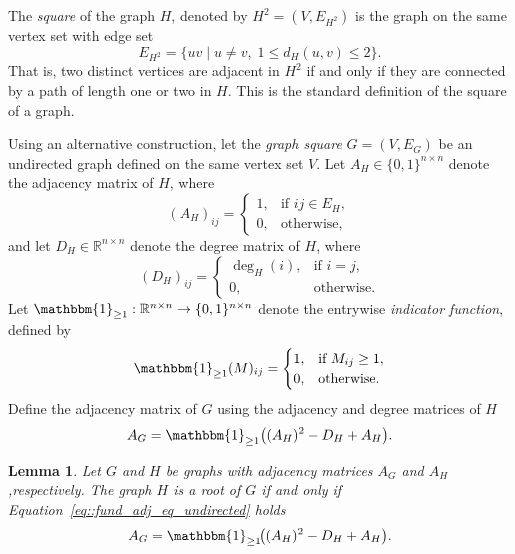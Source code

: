 \documentclass[11pt]{article}
\newtheorem{lemma}{Lemma}
\begin{document}
The \emph{square} of the graph $H$, denoted by $H^2 = (V, E_{H^2})$ is the graph on the same vertex set with edge set
\begin{equation} \label{eq::fund_def_square}
  E_{H^2} = \{ uv \mid u \neq v,\; 1 \leq d_H(u,v) \leq 2 \}.
\end{equation}
That is, two distinct vertices are adjacent in $H^2$ if and only if they are connected by a path of length one or two in $H$. This is the standard definition of the square of a graph.

Using an alternative construction, let the \emph{graph square} $G = (V, E_G)$ be an undirected graph defined on the same vertex set $V$. Let $A_H \in \{0,1\}^{n \times n}$ denote the adjacency matrix of $H$, where
\[
(A_H)_{ij} =
\begin{cases}
1 ,& \text{if } ij \in E_H, \\
0 ,& \text{otherwise},
\end{cases}
\]
and let $D_H \in \mathbb{R}^{n \times n}$ denote the degree matrix of $H$, where
\[
(D_H)_{ij} =
\begin{cases}
\deg_H(i) ,& \text{if } i = j, \\
0 ,& \text{otherwise}.
\end{cases}
\]
Let $\mathbbm{1}_{\geq 1} : \mathbb{R}^{n \times n} \to \{0,1\}^{n \times n}$ denote the entrywise \emph{indicator function}, defined by
\[
\mathbbm{1}_{\geq 1}(M)_{ij} =
\begin{cases}
1 ,& \text{if } M_{ij} \geq 1, \\
0 ,& \text{otherwise}.
\end{cases}
\]
Define the adjacency matrix of $G$ using the adjacency and degree matrices of $H$
\begin{equation} \label{eq::fund_adj_eq_undirected}
  A_G = \mathbbm{1}_{\geq 1}\big((A_H)^2 - D_H + A_H\big).
\end{equation}
\begin{lemma} \label{lemma::G_equal_to_H^2}
  Let $G$ and $H$ be graphs with adjacency matrices $A_G$ and $A_H$,respectively. The graph $H$ is a root of $G$ if and only if Equation~\ref{eq::fund_adj_eq_undirected} holds
  \[ 
  A_G = \mathbbm{1}_{\geq 1}\!\big((A_H)^2 - D_H + A_H\big).
  \]
\end{lemma}
\end{document}
